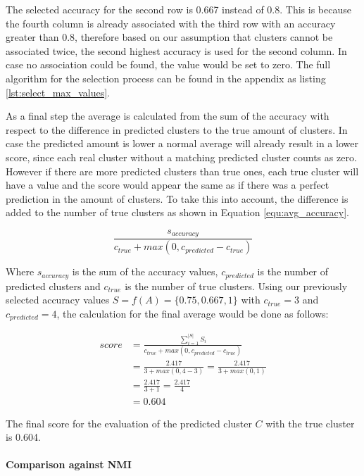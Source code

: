The selected accuracy for the second row is 0.667 instead of 0.8. This is because the fourth column is already associated with the third row with an accuracy greater than 0.8, therefore based on our assumption that clusters cannot be associated twice, the second highest accuracy is used for the second column. In case no association could be found, the value would be set to zero. The full algorithm for the selection process can be found in the appendix as listing \ref{lst:select_max_values}.

As a final step the average is calculated from the sum of the accuracy with respect to the difference in predicted clusters to the true amount of clusters. In case the predicted amount is lower a normal average will already result in a lower score, since each real cluster without a matching predicted cluster counts as zero. However if there are more predicted clusters than true ones, each true cluster will have a value and the score would appear the same as if there was a perfect prediction in the amount of clusters. To take this into account, the difference is added to the number of true clusters as shown in Equation \ref{equ:avg_accuracy}.

\begin{equation}
    \label{equ:avg_accuracy}
        \frac{s_{accuracy}}{c_{true} + max(0, c_{predicted} - c_{true})}
\end{equation}

Where $s_{accuracy}$ is the sum of the accuracy values, $c_{predicted}$ is the number of predicted clusters and $c_{true}$ is the number of true clusters. Using our previously selected accuracy values $S = f(A) = \{0.75, 0.667, 1\}$ with  $c_{true}=3$ and $c_{predicted}=4$, the calculation for the final average would be done as follows:

\begin{align*}
    score &= \frac{\sum_{i=1}^{|S|} S_i}{c_{true} + max(0, c_{predicted} - c_{true})} \\
    &= \frac{2.417}{3 + max(0, 4 - 3)} = \frac{2.417}{3 + max(0, 1)} \\
    &= \frac{2.417}{3 + 1} = \frac{2.417}{4} \\
    &= \mathbf{0.604}
\end{align*}

The final score for the evaluation of the predicted cluster $C$ with the true cluster is 0.604.

\paragraph{Comparison against NMI}

